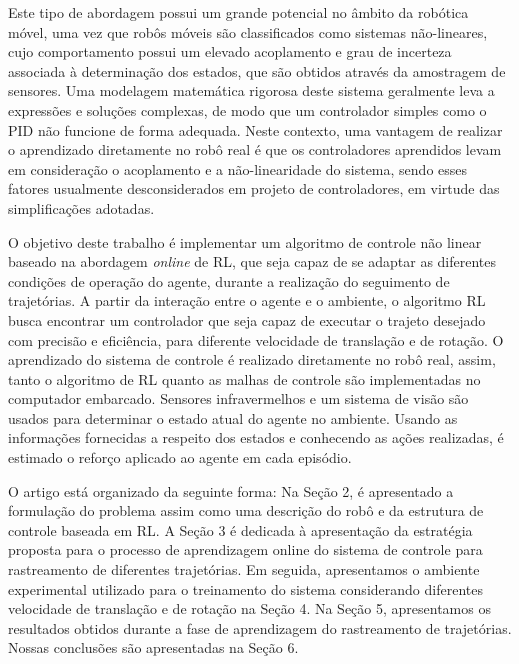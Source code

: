 \documentclass[a4paper]{ifacconf}
\begin{document}
Este tipo de abordagem possui um grande potencial no âmbito da robótica móvel, uma vez que robôs móveis são classificados como sistemas não-lineares, cujo comportamento possui um elevado acoplamento e grau de incerteza associada à determinação dos estados, que são obtidos através da amostragem de sensores. Uma modelagem matemática rigorosa deste sistema geralmente leva a expressões e soluções complexas, de modo que um controlador simples como o PID não funcione de forma adequada. Neste contexto, uma vantagem de realizar o aprendizado diretamente no robô real é que os controladores aprendidos levam em consideração o acoplamento e a não-linearidade do sistema, sendo esses fatores usualmente desconsiderados em projeto de controladores, em virtude das simplificações adotadas\cite{ql_pid_robotics}.

O objetivo deste trabalho é implementar um algoritmo de controle não linear baseado na abordagem \textit{online} de RL, que seja capaz de se adaptar as diferentes condições de operação do agente, durante a realização do seguimento de trajetórias. A partir da interação entre o agente e o ambiente, o algoritmo RL busca encontrar um controlador que seja capaz de executar o trajeto desejado com precisão e eficiência, para diferente velocidade de translação e de rotação. O aprendizado do sistema de controle é realizado diretamente no robô real, assim, tanto o algoritmo de RL quanto as malhas de controle são implementadas no computador embarcado. Sensores infravermelhos e um sistema de visão são usados para determinar o estado atual do agente no ambiente. Usando as informações fornecidas a respeito dos estados e conhecendo as ações realizadas, é estimado o reforço aplicado ao agente em cada episódio. 

O artigo está organizado da seguinte forma: Na Seção 2, é apresentado a formulação do problema assim como uma descrição do robô e da estrutura de controle baseada em RL. A Seção 3 é dedicada à apresentação da estratégia proposta para o processo de aprendizagem online do sistema de controle para rastreamento de diferentes trajetórias. Em seguida, apresentamos o ambiente experimental utilizado para o treinamento do sistema considerando diferentes velocidade de translação e de rotação na Seção 4. Na Seção 5, apresentamos os resultados obtidos durante a fase de aprendizagem do rastreamento de trajetórias. Nossas conclusões são apresentadas na Seção 6.

\end{document}
